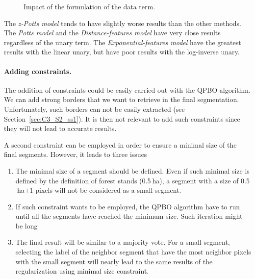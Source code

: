 \begin{figure}[htbp]
\begin{center}
{\label{subfig:C3_S3_ss4_priord}
}
\hspace*{0.025\textwidth}
\endgroup
\caption{Impact of the formulation of the data term.}
\label{fig:C3_S3_ss4_prior}
\end{center}
\end{figure}

The \textit{z-Potts model} tends to have slightly worse results than the other methods. The \textit{Potts model} and the \textit{Distance-features model} have very close results regardless of the unary term. The \textit{Exponential-features model} have the greatest results with the linear unary, but have poor results with the log-inverse unary.

\paragraph{Adding constraints. \\}
The addition of constraints could be easily carried out with the QPBO algorithm. We can add strong borders that we want to retrieve in the final segmentation. Unfortunately, such borders can not be easily extracted (see Section~\ref{sec:C3_S2_ss1}). It is then not relevant to add such constraints since they will not lead to accurate results. 

A second constraint can be employed in order to ensure a minimal size of the final segments. However, it leads to three issues
\begin{enumerate}
\item The minimal size of a segment should be defined. Even if such minimal size is defined by the definition of forest stands (0.5$\:$ha), a segment with a size of 0.5$\:$ha$+$1 pixels will not be considered as a small segment.
\item If such constraint wants to be employed, the QPBO algorithm have to run until all the segments have reached the minimum size. Such iteration might be long
\item The final result will be similar to a majority vote. For a small segment, selecting the label of the neighbor segment that have the most neighbor pixels with the small segment will nearly lead to the same results of the regularization using minimal size constraint.
\end{enumerate}

